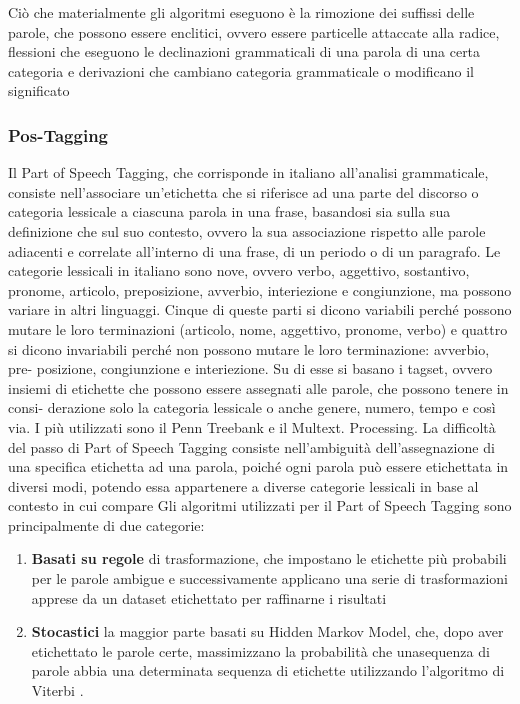  Ciò che materialmente gli algoritmi eseguono è la rimozione dei suffissi delle parole, che possono essere enclitici, ovvero essere particelle attaccate alla radice, flessioni che eseguono le declinazioni grammaticali di una parola di una certa categoria e derivazioni che cambiano categoria grammaticale o modificano il significato  

\subsubsection{Pos-Tagging}
 
Il Part of Speech Tagging, che corrisponde in italiano all'analisi grammaticale, consiste nell’associare un'etichetta che si riferisce ad una parte del discorso o categoria lessicale a ciascuna parola in una frase, basandosi sia sulla sua definizione che sul  suo contesto, ovvero la sua associazione rispetto alle parole adiacenti e correlate all’interno di una frase, di un periodo o di un paragrafo.
Le categorie lessicali in italiano sono nove, ovvero verbo, aggettivo, sostantivo,
pronome, articolo, preposizione, avverbio, interiezione e congiunzione, ma possono
variare in altri linguaggi. Cinque di queste parti si dicono variabili perché possono
mutare le loro terminazioni (articolo, nome, aggettivo, pronome, verbo) e quattro
si dicono invariabili perché non possono mutare le loro terminazione: avverbio, pre-
posizione, congiunzione e interiezione. Su di esse si basano i tagset, ovvero insiemi
di etichette che possono essere assegnati alle parole, che possono tenere in consi-
derazione solo la categoria lessicale o anche genere, numero, tempo e così via. I
più utilizzati sono il Penn Treebank   e il Multext.
Processing.
La difficoltà del passo di Part of Speech Tagging consiste nell’ambiguità dell'assegnazione di una specifica etichetta ad una parola, poiché ogni parola può essere
etichettata in diversi modi, potendo essa appartenere a diverse categorie lessicali in base al contesto in cui compare 
Gli algoritmi utilizzati per il Part of Speech Tagging sono principalmente di due
categorie:
\begin{enumerate}
\item \textbf{Basati su regole}  di trasformazione, che impostano le etichette più probabili
per le parole ambigue e successivamente applicano una serie di trasformazioni
apprese da un dataset etichettato per raffinarne i risultati 
\item \textbf{Stocastici} la maggior parte basati su Hidden Markov Model,
che, dopo aver etichettato le parole certe, massimizzano la probabilità che unasequenza di parole abbia una determinata sequenza di etichette utilizzando l'algoritmo di Viterbi \cite{Ryan:1993:VA:901051}.
\end{enumerate}
